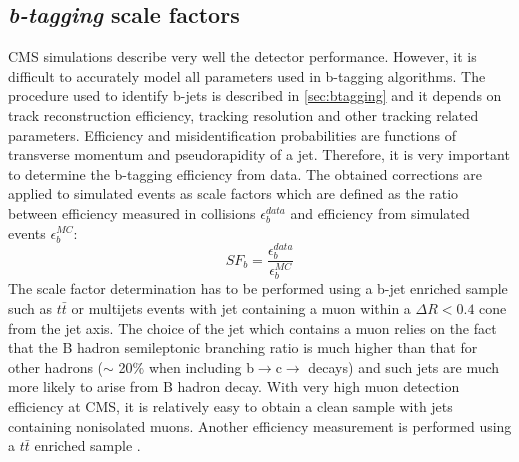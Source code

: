 
\subsection{\textit{b-tagging} scale factors}
\label{sec:btag}

CMS simulations describe very well the detector performance. However, it is difficult to accurately model all parameters used in b-tagging algorithms. The procedure used to identify b-jets is described in \ref{sec:btagging} and it depends on track reconstruction efficiency, tracking resolution and other tracking related parameters. Efficiency and misidentification probabilities are functions of transverse momentum and pseudorapidity of a jet. Therefore, it is very important to determine the b-tagging efficiency from data. The obtained corrections are applied to simulated events as scale factors which are defined as the ratio between efficiency measured in collisions $\epsilon_b^{data}$ and efficiency from simulated events $\epsilon_b^{MC}$:
\begin{equation}
SF_b=\frac{\epsilon_b^{data}}{\epsilon_b^{MC}}
\end{equation}
The scale factor determination has to be performed using a b-jet enriched sample such as $t\bar{t}$ or multijets events with jet containing a muon within a $\Delta R <0.4$ cone from the jet axis. The choice of the jet which contains a muon relies on the fact that the B hadron semileptonic branching ratio is much higher than that for other hadrons ($\sim$ 20$\%$ when including b$\rightarrow$c$\rightarrow$ decays) and such jets are much more likely to arise from B hadron decay. With very high muon detection efficiency at CMS, it is relatively easy to obtain a clean sample with jets containing nonisolated muons. Another efficiency measurement is performed using a $t\bar{t}$ enriched sample \cite{CMS:2013vea}.
